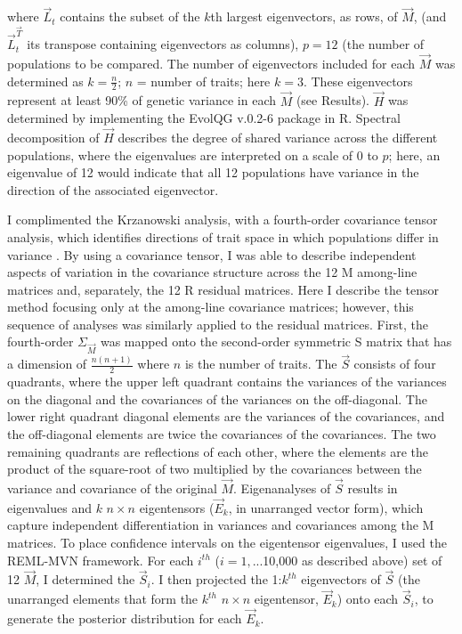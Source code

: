\noindent where $\vec{L}_{t}$ contains the subset of the $k$th largest eigenvectors, as rows, of $\vec{M}$, (and $\vec{L}_{t}^{\vec{T}}$ its transpose containing eigenvectors as columns), $p = 12$ (the number of populations to be compared. The number of eigenvectors included for each $\vec{M}$ was determined as $k = \frac{n}{2}$; $n$ = number of traits; here $k = 3$. These eigenvectors represent at least 90\% of genetic variance in each $\vec{M}$ (see Results). $\vec{H}$ was determined by implementing the EvolQG v.0.2-6 \citep{Melo15} package in R. Spectral decomposition of $\vec{H}$ describes the degree of shared variance across the different populations, where the eigenvalues are interpreted on a scale of 0 to $p$; here, an eigenvalue of 12 would indicate that all 12 populations have variance in the direction of the associated eigenvector.\par 

I complimented the Krzanowski analysis, with a fourth-order covariance tensor analysis, which identifies directions of trait space in which populations differ in variance \citep{Hine09, Agui14}. By using a covariance tensor, I was able to describe independent aspects of variation in the covariance structure across the 12 M among-line matrices and, separately, the 12 R residual matrices. Here I describe the tensor method focusing only at the among-line covariance matrices; however, this sequence of analyses was similarly applied to the residual matrices. First, the fourth-order $\Sigma_{\vec{M}}$ was mapped onto the second-order symmetric S matrix that has a dimension of $\frac{n(n+1)}{2}$ where $n$ is the number of traits. The $\vec{S}$ consists of four quadrants, where the upper left quadrant contains the variances of the variances on the diagonal and the covariances of the variances on the off-diagonal. The lower right quadrant diagonal elements are the variances of the covariances, and the off-diagonal elements are twice the covariances of the covariances. The two remaining quadrants are reflections of each other, where the elements are the product of the square-root of two multiplied by the covariances between the variance and covariance of the original $\vec{M}$. Eigenanalyses of $\vec{S}$ results in eigenvalues and $k$ $n \times n$ eigentensors ($\vec{E}_k$, in unarranged vector form), which capture independent differentiation in variances and covariances among the M matrices. To place confidence intervals on the eigentensor eigenvalues, I used the REML-MVN framework. For each $i^{th}$ ($i=1,$...10,000 as described above) set of 12 $\vec{M}$, I determined the $\vec{S}_i$. I then projected the 1:$k^{th}$ eigenvectors of $\vec{S}$ (the unarranged elements that form the $k^{th}$ $n \times n$ eigentensor, $\vec{E}_k$) onto each $\vec{S}_i$, to generate the posterior distribution for each $\vec{E}_k$.\par

